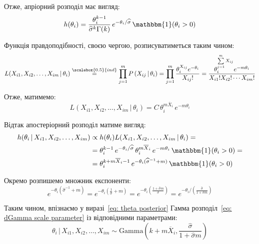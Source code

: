 \documentclass{mathreport}
\begin{document}
Отже, апріорний розподіл має вигляд:
\begin{equation}
    h(\theta_i) = \frac{\theta_{i}^{k-1}}{\widehat{\sigma}^{k}\Gamma(k)}\, e^{-\theta_{i}/\widehat{\sigma}}\, \mathbbm{1}(\theta_{i}>0)
\end{equation}

Функція правдоподібності, своєю чергою, розписуватиметься таким чином: 
\begin{equation}
    L(X_{i1},X_{i2},\ldots,X_{im} \,|\, \theta_i) \overset{\scalebox{0.5}{ind}}{=} \prod\limits_{j=1}^{m} P\left( X_{ij} \,|\, \theta_{i} \right) = \prod\limits_{j=1}^{m} \frac{\theta_{i}^{X_{ij}}e^{-\theta_{i}}}{X_{ij}!} = \frac{\theta_{i}^{\sum\limits_{j=1}^{m}X_{ij}}e^{-m\theta_{i}}}{X_{i1}!X_{i2}! \cdots X_{im}!}
\end{equation}

Отже, матимемо:
\begin{equation}
    L(X_{i1},X_{i2},\ldots,X_{im} \,|\, \theta_i) = C\, \theta_{i}^{m\overline{X}_i}\, e^{-m\theta_{i}}
\end{equation}

Відтак апостеріорний розподіл матиме вигляд:
\begin{align}
    h(\theta_i \,|\, X_{i1},X_{i2},\ldots,X_{im}) &\propto h(\theta_i) L(X_{i1},X_{i2},\ldots,X_{im} \,|\, \theta_i) = \notag \\
    & = \theta_{i}^{k-1}\, e^{-\theta_{i}/\widehat{\sigma}}\, \theta_{i}^{m\overline{X}_i}\, e^{-m\theta_{i}}\, \mathbbm{1}(\theta_{i}>0) = \notag \\
    & = \theta_{i}^{k+m\overline{X}_i-1}\, e^{-\theta_{i}(\widehat{\sigma}^{-1}+m)}\, \mathbbm{1}(\theta_{i}>0) \label{eq: theta posterior}
\end{align}

Окремо розпишемо множник експоненти:
\begin{equation}
    e^{-\theta_{i}(\widehat{\sigma}^{-1}+m)} = e^{-\theta_{i}\left( \frac{1}{\widehat{\sigma}}+m \right)} = e^{-\theta_{i}\left( \frac{1+\widehat{\sigma}m}{\widehat{\sigma}} \right)} = e^{-\theta_{i}/\left( \frac{\widehat{\sigma}}{1+\widehat{\sigma}m} \right)}
\end{equation}

Таким чином, впізнаємо у виразі~\eqref{eq: theta posterior} Гамма розподіл~\eqref{eq: dGamma scale parameter} із відповідними параметрами:
\begin{equation}
    \theta_i \,|\, X_{i1},X_{i2},\ldots,X_{im} \sim \mathrm{Gamma}\left( k+m\overline{X}_i,\frac{\widehat{\sigma}}{1+\widehat{\sigma}m} \right)
\end{equation}
\end{document}
